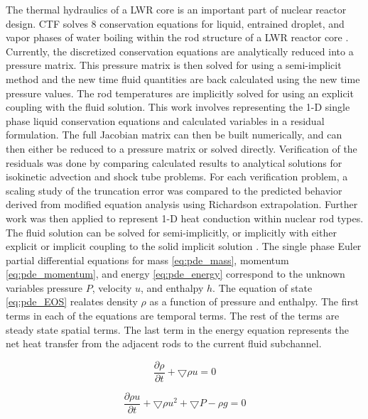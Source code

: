 	The thermal hydraulics of a LWR core is an important part of nuclear
	reactor design. CTF solves 8 conservation equations for liquid,
	entrained droplet, and vapor phases of water boiling within the rod structure
	of a LWR reactor core \cite{Salko2014}. Currently, the discretized conservation
	equations are analytically reduced into a pressure matrix. This pressure
	matrix is then solved for using a semi-implicit method and the new time
	fluid quantities are back calculated using the new time pressure values. The
	rod temperatures are implicitly solved for using an explicit coupling with the
	fluid solution.  This work involves representing the 1-D single phase liquid
	conservation equations and calculated variables in a residual formulation. The
	full Jacobian matrix can then be built numerically, and  can then either be
	reduced to a pressure matrix or solved directly. Verification of the residuals
	was done by comparing calculated results to analytical solutions for isokinetic
	advection and shock tube problems. For each verification problem, a scaling
	study of the truncation error was compared to the predicted behavior derived
	from modified equation analysis using Richardson extrapolation. Further work
	was then applied to represent 1-D heat conduction within nuclear rod types.
	The fluid solution can be solved for semi-implicitly, or implicitly with either
	explicit or implicit coupling to the solid implicit solution . The single phase
	Euler partial differential equations for mass \eqref{eq:pde_mass}, momentum
	\eqref{eq:pde_momentum}, and energy \eqref{eq:pde_energy} correspond to the
	unknown variables pressure $P$, velocity $u$, and enthalpy $h$. The equation
	of state \eqref{eq:pde_EOS} realates density $\rho$ as a function of pressure
	and enthalpy. The first terms in each of the equations are temporal terms. The
	rest of the terms are steady state spatial terms. The last term in the energy
	equation represents the net heat transfer from the adjacent rods to the
	current fluid subchannel.
    
    \begin{equation}
    	\label{eq:pde_mass}
    	\frac{ \partial \rho}{\partial t} + \bigtriangledown \rho u = 0
    \end{equation}
    
    \begin{equation}
    	\label{eq:pde_momentum}
    	\frac{ \partial \rho u}{\partial t} + \bigtriangledown \rho u^{2} +
    	\bigtriangledown P - \rho g  = 0
    \end{equation}
    
